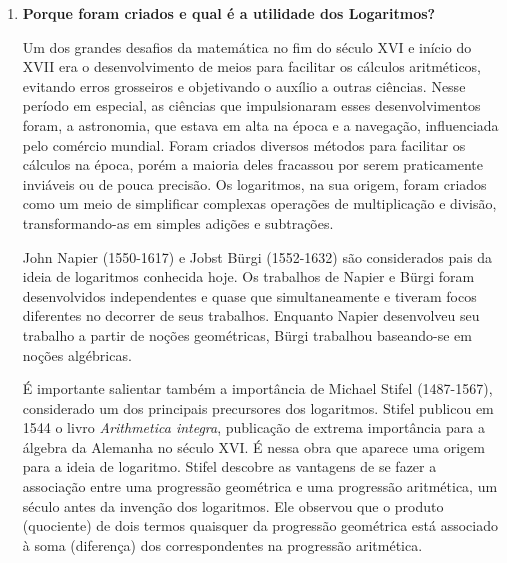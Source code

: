 \documentclass[12pt]{article}
\begin{document}
\vspace{\baselineskip}
\setlength{\parskip}{0.0pt}
\begin{enumerate}[label*={\fontsize{14pt}{14pt}\selectfont \textbf{\arabic*.}}]
	\item {\fontsize{14pt}{16.8pt}\selectfont \textbf{Porque foram criados e qual é a utilidade dos Logaritmos?}\par}\par


\vspace{\baselineskip}
\begin{justify}
\tab Um dos grandes desafios da matemática no fim do século XVI e início do XVII era o desenvolvimento de meios para facilitar os cálculos aritméticos, evitando erros grosseiros e objetivando o auxílio a outras ciências. Nesse período em especial, as ciências que impulsionaram esses desenvolvimentos foram, a astronomia, que estava em alta na época e a navegação, influenciada pelo comércio mundial. Foram criados diversos métodos para facilitar os cálculos na época, porém a maioria deles fracassou por serem praticamente inviáveis ou de pouca precisão. Os logaritmos, na sua origem, foram criados como um meio de simplificar complexas operações de multiplicação e divisão, transformando-as em simples adições e subtrações.
\end{justify}\par

\begin{justify}
\tab John Napier (1550-1617) e Jobst Bürgi (1552-1632) são considerados pais da ideia de logaritmos conhecida hoje. Os trabalhos de Napier e Bürgi foram desenvolvidos independentes e quase que simultaneamente e tiveram focos diferentes no decorrer de seus trabalhos. Enquanto Napier desenvolveu seu trabalho a partir de noções geométricas, Bürgi trabalhou baseando-se em noções algébricas. 
\end{justify}\par

\begin{justify}
\tab É importante salientar também a importância de Michael Stifel (1487-1567), considerado um dos principais precursores dos logaritmos. Stifel publicou em 1544 o livro \textit{Arithmetica integra}, publicação de extrema importância para a álgebra da Alemanha no século XVI. É nessa obra que aparece uma origem para a ideia de logaritmo. Stifel descobre as vantagens de se fazer a associação entre uma progressão geométrica e uma progressão aritmética, um século antes da invenção dos logaritmos. Ele observou que o produto (quociente) de dois termos quaisquer da progressão geométrica está associado à soma (diferença) dos correspondentes na progressão aritmética.
\end{justify}\par


\end{enumerate}
\end{document}
